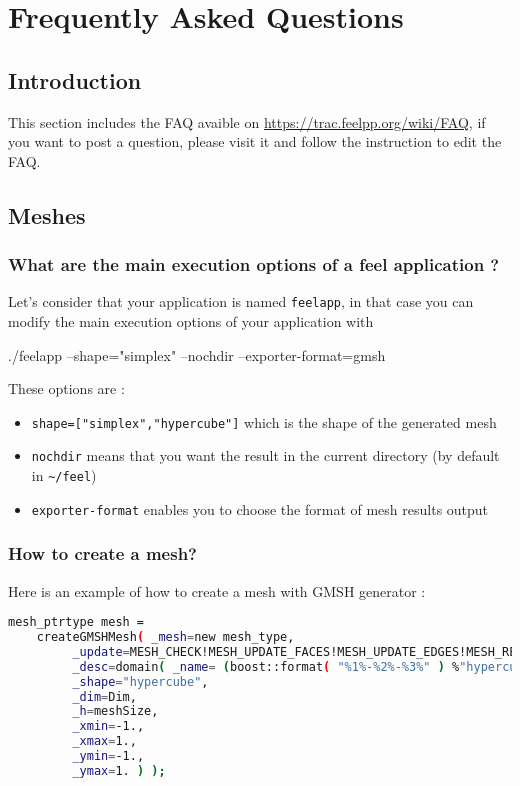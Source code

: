 \chapter{Frequently Asked Questions}
\label{sec:faq}

\section{Introduction}
\label{faq:intro}

This section includes the FAQ avaible on \href{Feel++ web site}{https://trac.feelpp.org/wiki/FAQ}, if you want to post a question, please visit it and follow the instruction to edit the FAQ.

\section{Meshes}
\label{faq:meshes}

\subsection{What are the main execution options of a feel application ?}
Let's consider that your application is named \lstinline!feelapp!, in that case you can modify the main execution options of your application with 
\begin{unixcom}
		./feelapp --shape="simplex" --nochdir --exporter-format=gmsh
\end{unixcom}
These options are :
\begin{itemize}
\item \lstinline!shape=["simplex","hypercube"]! which is the shape of the generated mesh
\item \lstinline!nochdir! means that you want the result in the current directory (by default in \lstinline!~/feel!)
\item \lstinline!exporter-format! enables you to choose the format of mesh results output
\end{itemize}

\subsection{How to create a mesh?}
Here is an example of how to create a mesh with GMSH generator :

\begin{lstlisting}[language=sh]
 mesh_ptrtype mesh = 
	createGMSHMesh( _mesh=new mesh_type,
         _update=MESH_CHECK!MESH_UPDATE_FACES!MESH_UPDATE_EDGES!MESH_RENUMBER,
         _desc=domain( _name= (boost::format( "%1%-%2%-%3%" ) %"hypercube" %Dim %1).str(),
         _shape="hypercube",
         _dim=Dim,
         _h=meshSize,
         _xmin=-1.,
         _xmax=1.,
         _ymin=-1.,
         _ymax=1. ) );
\end{lstlisting}

